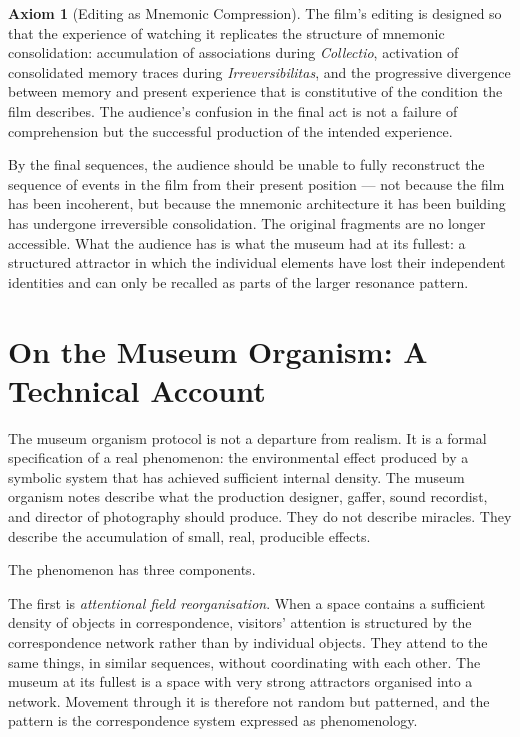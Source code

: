 \documentclass[12pt, a4paper, twoside]{memoir}
\theoremstyle{definition}
\newtheorem{axiom}{Axiom}[chapter]
\theoremstyle{remark}
\begin{document}
\begin{axiom}[Editing as Mnemonic Compression]
The film's editing is designed so that the experience of watching it replicates the structure of mnemonic consolidation: accumulation of associations during \textit{Collectio}, activation of consolidated memory traces during \textit{Irreversibilitas}, and the progressive divergence between memory and present experience that is constitutive of the condition the film describes. The audience's confusion in the final act is not a failure of comprehension but the successful production of the intended experience.
\end{axiom}

By the final sequences, the audience should be unable to fully reconstruct the sequence of events in the film from their present position --- not because the film has been incoherent, but because the mnemonic architecture it has been building has undergone irreversible consolidation. The original fragments are no longer accessible. What the audience has is what the museum had at its fullest: a structured attractor in which the individual elements have lost their independent identities and can only be recalled as parts of the larger resonance pattern.

\chapter{On the Museum Organism: A Technical Account}

The museum organism protocol is not a departure from realism. It is a formal specification of a real phenomenon: the environmental effect produced by a symbolic system that has achieved sufficient internal density. The museum organism notes describe what the production designer, gaffer, sound recordist, and director of photography should produce. They do not describe miracles. They describe the accumulation of small, real, producible effects.

The phenomenon has three components.

The first is \textit{attentional field reorganisation}. When a space contains a sufficient density of objects in correspondence, visitors' attention is structured by the correspondence network rather than by individual objects. They attend to the same things, in similar sequences, without coordinating with each other. The museum at its fullest is a space with very strong attractors organised into a network. Movement through it is therefore not random but patterned, and the pattern is the correspondence system expressed as phenomenology.
\end{document}
